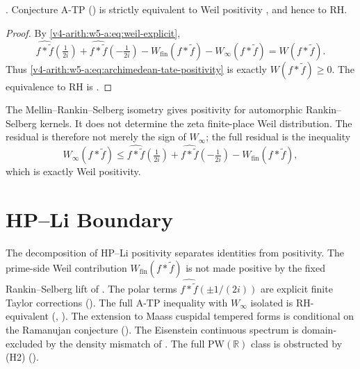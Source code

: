 \begin{theorem}[reformulation of A-TP]
\label{v4-arith:w5-a:thm:ATP-equals-weil-positivity}
\ClaimStatusProvedHere. Conjecture A-TP
() is strictly
equivalent to Weil positivity
, and hence to RH.
\end{theorem}

\begin{proof}
By \eqref{v4-arith:w5-a:eq:weil-explicit},
\[
\widehat{f*\widetilde f}(\tfrac{1}{2i})+
\widehat{f*\widetilde f}(-\tfrac{1}{2i})-
W_{\mathrm{fin}}(f*\widetilde f)-
W_{\infty}(f*\widetilde f)
=W(f*\widetilde f).
\]
Thus \eqref{v4-arith:w5-a:eq:archimedean-tate-positivity} is exactly
\(W(f*\widetilde f)\geq0\). The equivalence to RH is
.
\end{proof}

\begin{remark}
\label{v4-arith:w5-a:rem:honest-form}
The Mellin--Rankin--Selberg isometry gives positivity for automorphic
Rankin--Selberg kernels. It does not determine the zeta finite-place Weil
distribution. The residual is therefore not merely the sign of
\(W_{\infty}\); the full residual is the inequality
\[
W_{\infty}(f*\widetilde f)\le
\widehat{f*\widetilde f}(\tfrac{1}{2i})+
\widehat{f*\widetilde f}(-\tfrac{1}{2i})-
W_{\mathrm{fin}}(f*\widetilde f),
\]
which is exactly Weil positivity.
\end{remark}

\section{HP--Li Boundary}
\label{v4-arith:w5-a:form}

The decomposition of HP--Li positivity separates identities from
positivity. The prime-side Weil contribution
\(W_{\mathrm{fin}}(f*\widetilde{f})\) is not made positive by the fixed
Rankin--Selberg lift of . The polar
terms \(\widehat{f*\widetilde{f}}(\pm 1/(2i))\) are explicit finite
Taylor corrections ().
The full A-TP inequality with \(W_{\infty}\) isolated is RH-equivalent
(,
). The extension to
Maass cuspidal tempered forms is conditional on the Ramanujan conjecture
(). The Eisenstein continuous
spectrum is domain-excluded by the density mismatch of
. The full
\(\mathrm{PW}(\mathbb{R})\) class is obstructed by (H2)
().

